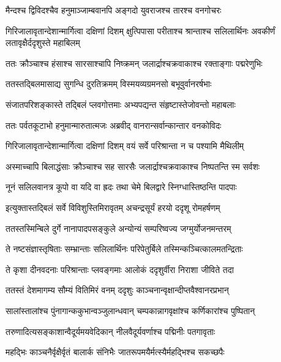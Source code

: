 \twolineshloka
{मैन्दश्च द्विविदश्चैव हनुमाञ्जाम्बवानपि}
{अङ्गदो युवराजश्च तारश्च वनगोचरः} %

\threelineshloka
{गिरिजालावृतान्देशान्मार्गित्वा दक्षिणां दिशम्}
{क्षुत्पिपासा परीताश्च श्रान्ताश्च सलिलार्थिनः}
{अवकीर्णं लतावृक्षैर्ददृशुस्ते महाबिलम्} %

\twolineshloka
{ततः क्रौञ्चाश्च हंसाश्च सारसाश्चापि निष्क्रमन्}
{जलार्द्राश्चक्रवाकाश्च रक्ताङ्गाः पद्मरेणुभिः} %

\twolineshloka
{ततस्तद्बिलमासाद्य सुगन्धि दुरतिक्रमम्}
{विस्मयव्यग्रमनसो बभूवुर्वानरर्षभाः} %

\twolineshloka
{संजातपरिशङ्कास्ते तद्बिलं प्लवगोत्तमाः}
{अभ्यपद्यन्त संहृष्टास्तेजोवन्तो महाबलाः} %

\twolineshloka
{ततः पर्वतकूटाभो हनुमान्मारुतात्मजः}
{अब्रवीद् वानरान्सर्वान्कान्तार वनकोविदः} %

\twolineshloka
{गिरिजालावृतान्देशान्मार्गित्वा दक्षिणां दिशम्}
{वयं सर्वे परिश्रान्ता न च पश्यामि मैथिलीम्} %

\twolineshloka
{अस्माच्चापि बिलाद्धंसाः क्रौञ्चाश्च सह सारसैः}
{जलार्द्राश्चक्रवाकाश्च निष्पतन्ति स्म सर्वशः} %

\twolineshloka
{नूनं सलिलवानत्र कूपो वा यदि वा ह्रदः}
{तथा चेमे बिलद्वारे स्निग्धास्तिष्ठन्ति पादपाः} %

\twolineshloka
{इत्युक्तास्तद्बिलं सर्वे विविशुस्तिमिरावृतम्}
{अचन्द्रसूर्यं हरयो ददृशू रोमहर्षणम्} %

\twolineshloka
{ततस्तस्मिन्बिले दुर्गे नानापादपसङ्कुले}
{अन्योन्यं सम्परिष्वज्य जग्मुर्योजनमन्तरम्} %

\twolineshloka
{ते नष्टसंज्ञास्तृषिताः सम्भ्रान्ताः सलिलार्थिनः}
{परिपेतुर्बिले तस्मिन्कञ्चित्कालमतन्द्रिताः} %

\twolineshloka
{ते कृशा दीनवदनाः परिश्रान्ताः प्लवङ्गमाः}
{आलोकं ददृशुर्वीरा निराशा जीविते तदा} %

\twolineshloka
{ततस्तं देशमागम्य सौम्यं वितिमिरं वनम्}
{ददृशुः काञ्चनान्वृक्षान्दीप्तवैश्वानरप्रभान्} %

\twolineshloka
{सालांस्तालांश्च पुंनागान्ककुभान्वञ्जुलान्धवान्}
{चम्पकान्नागवृक्षांश्च कर्णिकारांश्च पुष्पितान्} %

\twolineshloka
{तरुणादित्यसङ्काशान्वैदूर्यमयवेदिकान्}
{नीलवैदूर्यवर्णाश्च पद्मिनीः पतगावृताः} %

\twolineshloka
{महद्भिः काञ्चनैर्वृक्षैर्वृतं बालार्क संनिभैः}
{जातरूपमयैर्मत्स्यैर्महद्भिश्च सकच्छपैः} %

